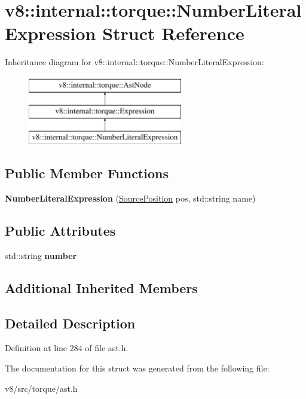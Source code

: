 \hypertarget{structv8_1_1internal_1_1torque_1_1NumberLiteralExpression}{}\section{v8\+:\+:internal\+:\+:torque\+:\+:Number\+Literal\+Expression Struct Reference}
\label{structv8_1_1internal_1_1torque_1_1NumberLiteralExpression}
Inheritance diagram for v8\+:\+:internal\+:\+:torque\+:\+:Number\+Literal\+Expression\+:\begin{figure}[H]
\begin{center}
\leavevmode
\includegraphics[height=3.000000cm]{structv8_1_1internal_1_1torque_1_1NumberLiteralExpression}
\end{center}
\end{figure}
\subsection*{Public Member Functions}
\begin{DoxyCompactItemize}
\item 
\mbox{\label{structv8_1_1internal_1_1torque_1_1NumberLiteralExpression_a4f9f39292aeb21924bce68fff7fac7a4}} 
{\bfseries Number\+Literal\+Expression} (\mbox{\hyperlink{structv8_1_1internal_1_1torque_1_1SourcePosition}{Source\+Position}} pos, std\+::string name)
\end{DoxyCompactItemize}
\subsection*{Public Attributes}
\begin{DoxyCompactItemize}
\item 
\mbox{\label{structv8_1_1internal_1_1torque_1_1NumberLiteralExpression_aebafeb9f45a15d06fb2591039bbe7508}} 
std\+::string {\bfseries number}
\end{DoxyCompactItemize}
\subsection*{Additional Inherited Members}


\subsection{Detailed Description}


Definition at line 284 of file ast.\+h.



The documentation for this struct was generated from the following file\+:\begin{DoxyCompactItemize}
\item 
v8/src/torque/ast.\+h\end{DoxyCompactItemize}
